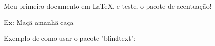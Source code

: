 \documentclass[a4paper,12pt]{article}
\begin{document}

Meu primeiro documento em \LaTeX, e testei o pacote de acentuação!

Ex: Maçã amanhã caça

Exemplo de como usar o pacote "blindtext":
\blindtext
\end{document}
